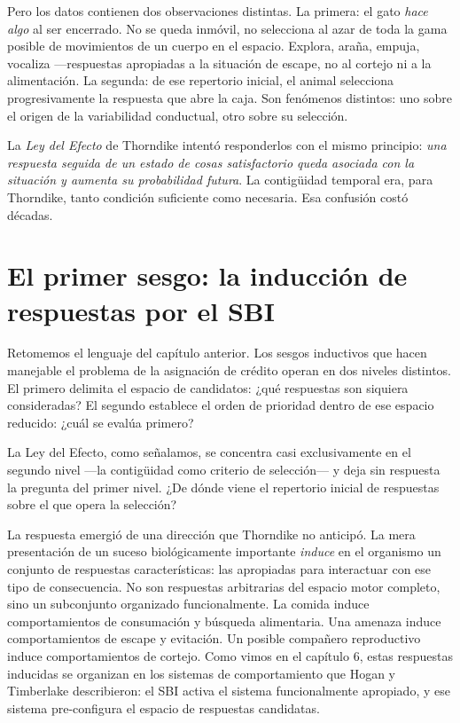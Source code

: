 \documentclass[
  letterpaper,
  DIV=11,
  numbers=noendperiod]{scrreprt}
\begin{document}
\begin{tcolorbox}[enhanced jigsaw, toprule=.15mm, arc=.35mm, colback=white, opacityback=0, colframe=quarto-callout-note-color-frame, breakable, rightrule=.15mm, left=2mm, leftrule=.75mm, bottomrule=.15mm]
Pero los datos contienen dos observaciones distintas. La primera: el
gato \emph{hace algo} al ser encerrado. No se queda inmóvil, no
selecciona al azar de toda la gama posible de movimientos de un cuerpo
en el espacio. Explora, araña, empuja, vocaliza ---respuestas apropiadas
a la situación de escape, no al cortejo ni a la alimentación. La
segunda: de ese repertorio inicial, el animal selecciona progresivamente
la respuesta que abre la caja. Son fenómenos distintos: uno sobre el
origen de la variabilidad conductual, otro sobre su selección.

La \emph{Ley del Efecto} de Thorndike intentó responderlos con el mismo
principio: \emph{una respuesta seguida de un estado de cosas
satisfactorio queda asociada con la situación y aumenta su probabilidad
futura}. La contigüidad temporal era, para Thorndike, tanto condición
suficiente como necesaria. Esa confusión costó décadas.

\section{El primer sesgo: la inducción de respuestas por el
SBI}\label{el-primer-sesgo-la-inducciuxf3n-de-respuestas-por-el-sbi}

Retomemos el lenguaje del capítulo anterior. Los sesgos inductivos que
hacen manejable el problema de la asignación de crédito operan en dos
niveles distintos. El primero delimita el espacio de candidatos: ¿qué
respuestas son siquiera consideradas? El segundo establece el orden de
prioridad dentro de ese espacio reducido: ¿cuál se evalúa primero?

La Ley del Efecto, como señalamos, se concentra casi exclusivamente en
el segundo nivel ---la contigüidad como criterio de selección--- y deja
sin respuesta la pregunta del primer nivel. ¿De dónde viene el
repertorio inicial de respuestas sobre el que opera la selección?

La respuesta emergió de una dirección que Thorndike no anticipó. La mera
presentación de un suceso biológicamente importante \emph{induce} en el
organismo un conjunto de respuestas características: las apropiadas para
interactuar con ese tipo de consecuencia. No son respuestas arbitrarias
del espacio motor completo, sino un subconjunto organizado
funcionalmente. La comida induce comportamientos de consumación y
búsqueda alimentaria. Una amenaza induce comportamientos de escape y
evitación. Un posible compañero reproductivo induce comportamientos de
cortejo. Como vimos en el capítulo 6, estas respuestas inducidas se
organizan en los sistemas de comportamiento que Hogan y Timberlake
describieron: el SBI activa el sistema funcionalmente apropiado, y ese
sistema pre-configura el espacio de respuestas candidatas.


\end{tcolorbox}
\end{document}
